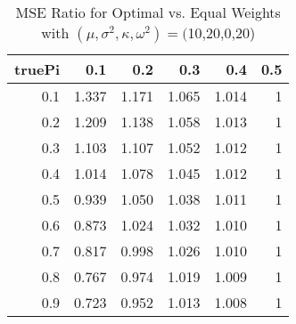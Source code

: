 \begin{table}

\caption{\label{tab:}MSE Ratio for Optimal vs. Equal Weights with $(\mu, \sigma^2, \kappa, \omega^2) = ($10,20,0,20)}
\centering
\begin{tabular}[t]{rrrrrr}
\toprule
truePi & 0.1 & 0.2 & 0.3 & 0.4 & 0.5\\
\midrule
0.1 & 1.337 & 1.171 & 1.065 & 1.014 & 1\\
0.2 & 1.209 & 1.138 & 1.058 & 1.013 & 1\\
0.3 & 1.103 & 1.107 & 1.052 & 1.012 & 1\\
0.4 & 1.014 & 1.078 & 1.045 & 1.012 & 1\\
0.5 & 0.939 & 1.050 & 1.038 & 1.011 & 1\\
0.6 & 0.873 & 1.024 & 1.032 & 1.010 & 1\\
0.7 & 0.817 & 0.998 & 1.026 & 1.010 & 1\\
0.8 & 0.767 & 0.974 & 1.019 & 1.009 & 1\\
0.9 & 0.723 & 0.952 & 1.013 & 1.008 & 1\\
\bottomrule
\end{tabular}
\end{table}
